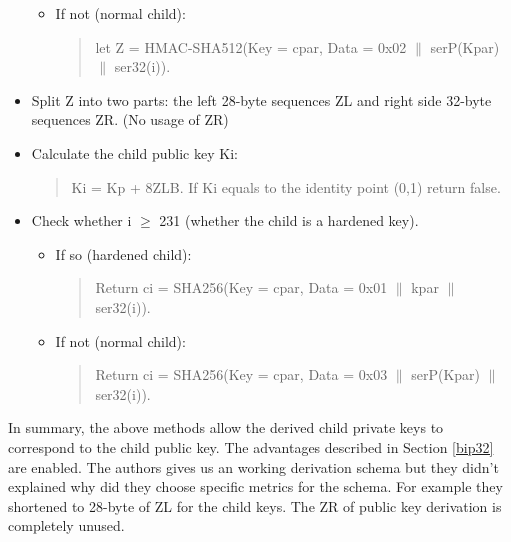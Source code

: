 \begin{adjustwidth}{0.5cm}{}
\begin{itemize}
\begin{itemize}
\begin{quote}
                        \end{quote}

                  \item If not (normal child):
                        \begin{quote}
                            let Z = HMAC-SHA512(Key = cpar, Data = 0x02 $\parallel$ serP(Kpar) $\parallel$ ser32(i)).

                        \end{quote}
              \end{itemize}
              \bigskip

        \item Split Z into two parts: the left 28-byte sequences ZL and right side 32-byte sequences ZR. (No usage of  ZR)

              \bigskip
        \item Calculate the child public key Ki:
              \begin{quote}
                  Ki = Kp + 8ZLB. If Ki equals to the identity point (0,1) return false.
              \end{quote}

              \bigskip

        \item Check whether i $\geq$ 231 (whether the child is a hardened key).
              \begin{itemize}
                  \item If so (hardened child):
                        \begin{quote}
                            Return ci = SHA256(Key = cpar, Data = 0x01 $\parallel$ kpar $\parallel$ ser32(i)).
                        \end{quote}
                  \item If not (normal child):
                        \begin{quote}
                            Return ci = SHA256(Key = cpar, Data = 0x03 $\parallel$ serP(Kpar) $\parallel$ ser32(i)).
                        \end{quote}
              \end{itemize}
              \bigskip

    \end{itemize}

    In summary, the above methods allow the derived child private keys to correspond to the child public key. The advantages described in Section \ref{bip32} are enabled.
    The authors gives us an working derivation schema but they didn't explained why did they choose specific metrics for the schema. For example they shortened to 28-byte of ZL for the child keys.
    The ZR of public key derivation is completely unused.

\end{adjustwidth}

